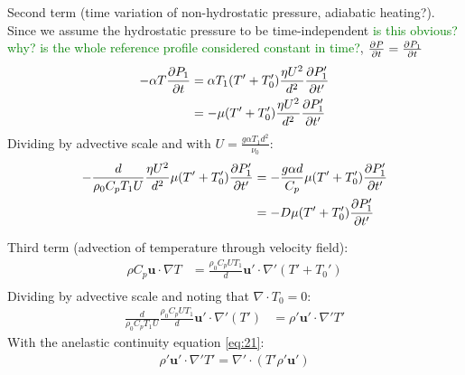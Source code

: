 \documentclass[document.tex]{subfiles}
\begin{document}
\begin{mdframed}
    Second term (time variation of non-hydrostatic pressure, adiabatic heating?). Since we assume the hydrostatic pressure to be time-independent \textcolor{green}{is this obvious? why? is the whole reference profile considered 
    constant in time?}, $\pdv{P}{t} = \pdv{P_1}{t}$ 
    \begin{align*}
        -\alpha T \pdv{P_1}{t} &= \alpha T_1 (T' + T_0') \frac{\eta U^2}{d^2} \pdv{P_1'}{t'} \\
        &= -\mu (T' + T_0') \frac{\eta U^2}{d^2} \pdv{P_1'}{t'}
    \end{align*}
    Dividing by advective scale and with $U = \frac{g\alpha T_1d^2}{\nu_0}$: 
    \begin{align*}
        -\frac{d}{\rho_0C_p T_1 U} \frac{\eta U^2}{d^2}\mu (T' + T_0')  \pdv{P_1'}{t'} &= -\frac{g\alpha d}{C_p} \mu (T' + T_0') \pdv{P_1'}{t'} \\
        &= -D\mu (T' + T_0') \pdv{P_1'}{t'} \\
    \end{align*}
\end{mdframed}
\begin{mdframed}
    Third term (advection of temperature through velocity field): 
    \begin{align*}
        \rho C_p \bm{u}\cdot\nabla T &= \frac{\rho_0C_pUT_1}{d} \bm{u'} \cdot \nabla '(T'+T_0') \\
    \end{align*}
    Dividing by advective scale and noting that $\nabla \cdot T_0 = 0$:   
    \begin{align*}
        \frac{d}{\rho_0C_p T_1 U} \frac{\rho_0C_pUT_1}{d} \bm{u'} \cdot \nabla '(T') & = \rho' \bm{u'} \cdot \nabla 'T'
    \end{align*}
    With the anelastic continuity equation \eqref{eq:21}: 
    \begin{align*}
        \rho' \bm{u'} \cdot \nabla 'T' = \nabla' \cdot (T'\rho'\bm{u'})
    \end{align*}
\end{mdframed}
\end{document}
